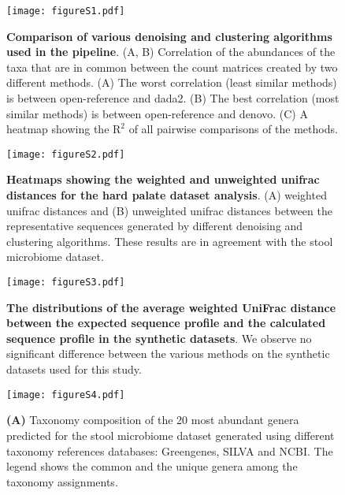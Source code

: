   \begin{figure}[h]
  \centering
  \texttt{[image: figureS1.pdf]}
  \caption{
    \textbf{Comparison of various denoising and clustering algorithms used in the pipeline}.
    (A, B) Correlation of the abundances of the taxa that are in common between the count matrices created by two different methods.
    (A) The worst correlation (least similar methods) is between open-reference and dada2.
    (B) The best correlation (most similar methods) is between open-reference and denovo.
    (C) A heatmap showing the $\mathrm{R}^2$ of all pairwise comparisons of the methods.
  }
  \label{fig:figureS1}
\end{figure}

  \begin{figure}[h]
    \centering
    \texttt{[image: figureS2.pdf]}
    \caption{
      \textbf{Heatmaps showing the weighted and unweighted unifrac distances for the hard palate dataset analysis}.
      (A) weighted unifrac distances and (B) unweighted unifrac distances between the representative sequences generated by different denoising and clustering algorithms.
      These results are in agreement with the stool microbiome dataset.
    }
    \label{fig:figureS2}
  \end{figure}

  \begin{figure}[h]
    \centering
    \texttt{[image: figureS3.pdf]}
    \caption{
      \textbf{The distributions of the average weighted UniFrac distance between the expected sequence profile and the calculated sequence profile in the synthetic datasets}.
      We observe no significant difference between the various methods on the synthetic datasets used for this study.
    }
    \label{fig:figureS3}
  \end{figure}


  \begin{figure}[h]
    \centering
    \texttt{[image: figureS4.pdf]}
    \caption{
      \textbf{(A)} Taxonomy composition of the 20 most abundant genera predicted for the stool microbiome dataset generated using different taxonomy references databases: Greengenes, SILVA and NCBI.
      The legend shows the common and the unique genera among the taxonomy assignments.
  }
    \label{fig:figureS4}
  \end{figure}

